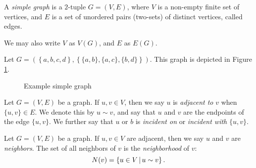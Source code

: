 \begin{defn}
    A \emph{simple graph} is a $2$-tuple $G = (V, E)$, where $V$ is a non-empty finite set of vertices, and $E$ is a set of unordered pairs (two-sets) of distinct vertices, called edges.
\end{defn}

\begin{rmk}
    We may also write $V$ as $V(G)$, and $E$ as $E(G)$.
\end{rmk}

\begin{exmp} Let $G = \left(\left\{a, b, c, d\right\}, \left\{\{a, b\}, \{a, c\}, \{b, d\}\right\}\right)$. This graph is depicted in Figure \ref{fig:example-simple-graph}.
\end{exmp}

\begin{figure}[ht!]
    \centering
\caption{Example simple graph}
\label{fig:example-simple-graph}
\end{figure}

\begin{defn}
    Let $G = (V, E)$ be a graph. If $u, v \in V$, then we say $u$ is \emph{adjacent to} $v$ when $\{u, v\} \in E$. We denote this by $u \sim v$, and say that $u$ and $v$ are the endpoints of the edge $\{u, v\}$. We further say that $u$ or $b$ is \emph{incident on} or \emph{incident with} $\{u, v\}$.
\end{defn}

\begin{defn}
    Let $G = (V, E)$ be a graph. If $u, v \in V$ are adjacent, then we say $u$ and $v$ are \emph{neighbors}. The set of all neighbors of $v$ is the \emph{neighborhood} of $v$:
    \[N(v) = \left\{u \in V \,\middle|\, u \sim v \right\}.\]
\end{defn}

